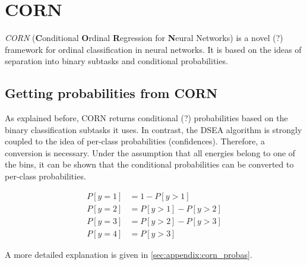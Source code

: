 \section{CORN}
\emph{CORN} (\textbf{C}onditional \textbf{O}rdinal \textbf{R}egression for \textbf{N}eural Networks) \cite{corn}
is a novel (?) framework for ordinal classification in neural networks.
It is based on the ideas of separation into binary subtasks and conditional probabilities.


\subsection{Getting probabilities from CORN} %
As explained before,
CORN returns conditional (?) probabilities based on the binary classification subtasks it uses.
In contrast,
the DSEA algorithm is strongly coupled to the idea of per-class probabilities (confidences).
Therefore, a conversion is necessary.
Under the assumption that all energies belong to one of the bins,
it can be shown that the conditional probabilities can be converted to per-class probabilities.

\begin{align*}
  P[y=1] &= 1 - P[y>1] \\
  P[y=2] &= P[y>1] - P[y>2] \\
  P[y=3] &= P[y>2] - P[y>3] \\
  P[y=4] &= P[y>3]
\end{align*}

A more detailed explanation is given in \autoref{sec:appendix:corn_probas}.
